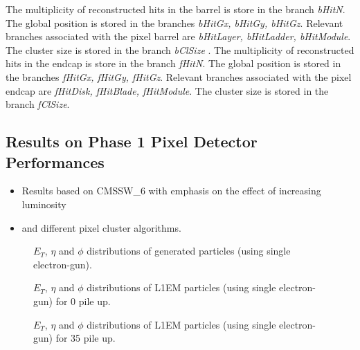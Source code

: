 \documentclass[a4paper,12pt,oneside]{article}
\begin{document}
\begin{itemize}
                    The multiplicity of reconstructed hits in the barrel is store in the
                     branch {\it bHitN}. The global position is stored in the branches {\it bHitGx, bHitGy, bHitGz}. Relevant
                     branches associated with the pixel barrel are {\it bHitLayer, bHitLadder, bHitModule}. 
                     The cluster size is stored in the branch {\it bClSize} . \newline
                     \noindent The multiplicity of reconstructed hits in the endcap is store in the branch {\it fHitN}. The global position is stored in the
                     branches {\it fHitGx, fHitGy, fHitGz}. Relevant branches associated with the pixel endcap are
                     {\it fHitDisk, fHitBlade, fHitModule}. The cluster size is stored in the branch {\it fClSize}. 
                   \end{itemize}



        \subsection{Results on Phase 1 Pixel Detector Performances}

        \begin{itemize}
          \item Results based on CMSSW\_6 with emphasis on the effect of increasing luminosity
          \item and different pixel cluster algorithms.
        \end{itemize}

        \begin{figure}[!htb]
          \centering
          \caption{$E_{T}$, $\eta$ and $\phi$ distributions of generated particles (using single electron-gun).}
          \label{}
        \end{figure}

        \begin{figure}[!htb]
          \centering
          \caption{$E_{T}$, $\eta$ and $\phi$ distributions of L1EM particles (using single electron-gun) for 0 pile up.}
          \label{}
        \end{figure}

        \begin{figure}[!htb]
          \centering
          \caption{$E_{T}$, $\eta$ and $\phi$ distributions of L1EM particles (using single electron-gun) for 35 pile up.}
          \label{}
        \end{figure}
\end{document}
